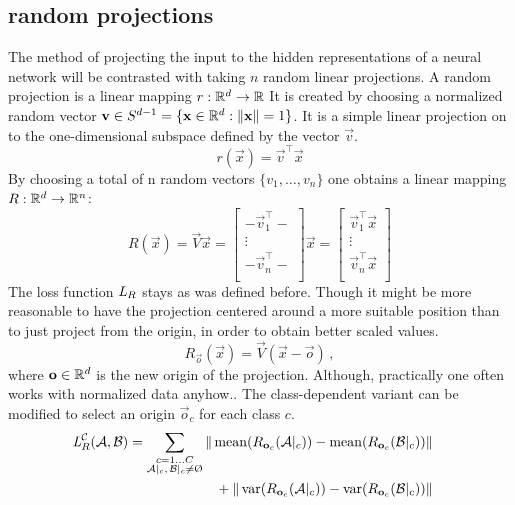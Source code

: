 \subsection{random projections}
The method of projecting the input to the hidden representations of a neural network will be contrasted with taking $n$ random linear projections.
A random projection is a linear mapping $r: \mathbb{R}^d \to \mathbb{R}$
It is created by choosing a normalized random vector $\mathbf v \in S^{d-1} = \{\mathbf x \in \mathbb{R}^d : \|\mathbf x\| = 1\}$.
It is a simple linear projection on to the one-dimensional subspace defined by the vector $\vec v$.
\[
    r(\vec x) = \vec v ^\top \vec x
\]
By choosing a total of n random vectors $\{v_1, \dots, v_n\}$ one obtains a linear mapping $R: \mathbb{R}^d \to \mathbb{R}^n$:
\[
    R(\vec x) = \vec V \vec x =
    \begin{bmatrix}
        - \vec v_1 ^\top - \\
        \vdots \\
        - \vec v_n ^\top - \\
    \end{bmatrix}
    \vec x =
    \begin{bmatrix}
        \vec v_1 ^\top \vec x \\
        \vdots \\
        \vec v_n ^\top \vec x \\
    \end{bmatrix}
\]
%
The loss function $\textit{L}_R$ stays as was defined before.
Though it might be more reasonable to have the projection centered around a more suitable position than to just project from the origin, in order to obtain better scaled values.
% 
\[
    R_{\vec o} (\vec x) = \vec V (\vec x - \vec o) \,,
\]
where $\mathbf o \in \mathbb{R}^d$ is the new origin of the projection. Although, practically one often works with normalized data anyhow..
The class-dependent variant can be modified to select an origin $\vec o_c$ for each class $c$.
% 
\begin{align*}
    \loss _R ^{\mathcal C} (\set A, \set B) &=
    \begin{aligned}[t]
        \sum _{\substack{c = 1 \dots C \\ \set A|_c ,\, \set B|_c \neq \emptyset}} 
        \|\mean ({R_{\vec o_c} (\set A|_c)}) - \mean ({R_{\vec o_c} (\set B|_c)}) \| \\
        {} + \|\var ({R_{\vec o_c} (\set A|_c)}) - \var ({R_{\vec o_c} (\set B|_c)}) \| 
    \end{aligned}
\end{align*}

